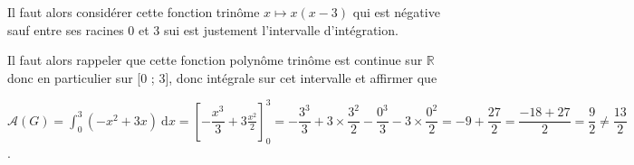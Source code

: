 \documentclass[10pt]{article}
\providecommand{\R}{\mathbb{R}}
\begin{document}
\begin{enumerate}
		Il faut alors considérer cette fonction trinôme $x \longmapsto x(x - 3)$ qui est négative sauf entre ses racines 0 et 3 sui est justement l'intervalle d'intégration.

		Il faut alors rappeler que cette fonction polynôme trinôme est continue sur $\R$ donc en particulier sur [0 ; 3], donc intégrale sur cet intervalle et affirmer que

		$\mathcal{A}(G) = \displaystyle\int_0^3 \left(- x^2 + 3x \right)\:\text{d}x = \left[- \dfrac{x^3}{3} + 3\frac{x^2}{2} \right]_0^3 = -\dfrac{3^3}{3} + 3\times \dfrac{3^2}{2} - \dfrac{0^3}{3} - 3\times \dfrac{0^2}{2}  = -9 + \dfrac{27}{2} = \dfrac{-18 + 27}{2} = \dfrac92 \ne \dfrac{13}{2}$.
\end{enumerate}
\end{document}
